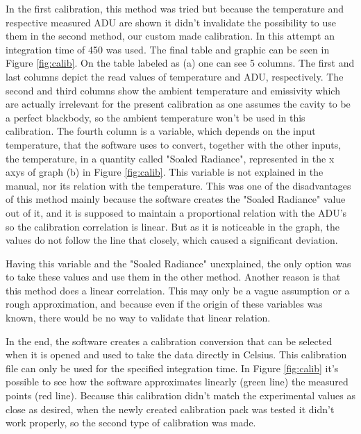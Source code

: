 \par In the first calibration, this method was tried but because the temperature and respective measured ADU are shown it didn't invalidate the possibility to use them in the second method, our custom made calibration. In this attempt an integration time of 450 was used. The final table and graphic can be seen in Figure \ref{fig:calib}. On the table labeled as (a) one can see 5 columns. The first and last columns depict the read values of temperature and ADU, respectively. The second and third columns show the ambient temperature and emissivity which are actually irrelevant for the present calibration as one assumes the cavity to be a perfect blackbody, so the ambient temperature won't be used in this calibration. The fourth column is a variable, which depends on the input temperature, that the software uses to convert, together with the other inputs, the temperature, in a quantity called "Soaled Radiance", represented in the x axys of graph (b) in Figure \ref{fig:calib}. This variable is not explained in the manual, nor its relation with the temperature. This was one of the disadvantages of this method mainly because the software creates the "Soaled Radiance" value out of it, and it is supposed to maintain a proportional relation with the ADU's so the calibration correlation is linear. But as it is noticeable in the graph, the values do not follow the line that closely, which caused a significant deviation. \\

\par Having this variable and the "Soaled Radiance" unexplained, the only option was to take these values and use them in the other method. Another reason is that this method does a linear correlation. This may only be a vague assumption or a rough approximation, and because even if the origin of these variables was known, there would be no way to validate that linear relation. \\

\par In the end, the software creates a calibration conversion that can be selected when it is opened and used to take the data directly in Celsius. This calibration file can only be used for the specified integration time. In Figure \ref{fig:calib} it's possible to see how the software approximates linearly (green line) the measured points (red line). Because this calibration didn't match the experimental values as close as desired, when the newly created calibration pack was tested it didn't work properly, so the second type of calibration was made.\\

